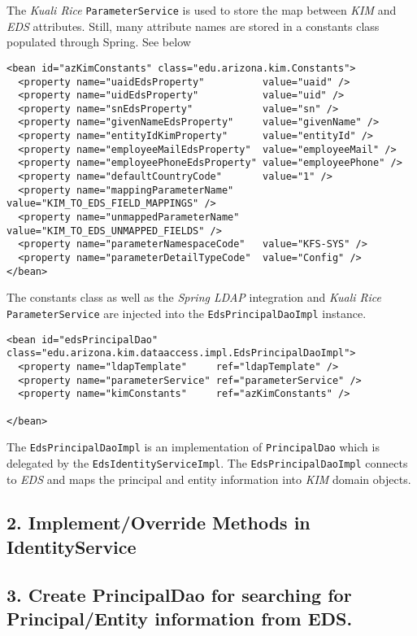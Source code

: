 \documentclass[12pt,notitlepage]{article}
\begin{document}
The \emph{Kuali Rice} \verb|ParameterService| is used to store the map between \emph{KIM} and \emph{EDS} attributes. Still,
many attribute names are stored in a constants class populated through Spring. See below
\begin{lstlisting}
<bean id="azKimConstants" class="edu.arizona.kim.Constants">
  <property name="uaidEdsProperty"          value="uaid" />
  <property name="uidEdsProperty"           value="uid" />
  <property name="snEdsProperty"            value="sn" />
  <property name="givenNameEdsProperty"     value="givenName" />
  <property name="entityIdKimProperty"      value="entityId" />
  <property name="employeeMailEdsProperty"  value="employeeMail" />
  <property name="employeePhoneEdsProperty" value="employeePhone" />
  <property name="defaultCountryCode"       value="1" />
  <property name="mappingParameterName"     value="KIM_TO_EDS_FIELD_MAPPINGS" />
  <property name="unmappedParameterName"    value="KIM_TO_EDS_UNMAPPED_FIELDS" />
  <property name="parameterNamespaceCode"   value="KFS-SYS" />
  <property name="parameterDetailTypeCode"  value="Config" />
</bean>
\end{lstlisting}

The constants class as well as the \emph{Spring LDAP} integration and \emph{Kuali Rice} \verb|ParameterService| are 
injected into the \verb|EdsPrincipalDaoImpl| instance.
\begin{lstlisting}
<bean id="edsPrincipalDao" class="edu.arizona.kim.dataaccess.impl.EdsPrincipalDaoImpl">
  <property name="ldapTemplate"     ref="ldapTemplate" />
  <property name="parameterService" ref="parameterService" />
  <property name="kimConstants"     ref="azKimConstants" />

</bean>\end{lstlisting}

The \verb|EdsPrincipalDaoImpl| is an implementation of \verb|PrincipalDao| which is delegated by the 
\verb|EdsIdentityServiceImpl|. The \verb|EdsPrincipalDaoImpl| connects to \emph{EDS} and maps the principal
and entity information into \emph{KIM} domain objects.

\subsection*{2. Implement/Override Methods in IdentityService}

\subsection*{3. Create PrincipalDao for searching for Principal/Entity information from EDS.}
\end{document}
